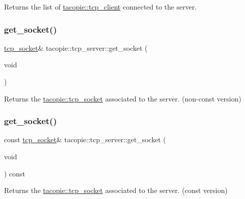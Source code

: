\begin{DoxyReturn}{Returns}
the list of \hyperlink{classtacopie_1_1tcp__client}{tacopie\+::tcp\+\_\+client} connected to the server. 
\end{DoxyReturn}
\mbox{\label{classtacopie_1_1tcp__server_a39a51b9203d42babfd9c4c1a0f4cc340}} 
\subsubsection{\texorpdfstring{get\+\_\+socket()}{get\_socket()}\hspace{0.1cm}{\footnotesize\ttfamily [1/2]}}
{\footnotesize\ttfamily \hyperlink{classtacopie_1_1tcp__socket}{tcp\+\_\+socket}\& tacopie\+::tcp\+\_\+server\+::get\+\_\+socket (\begin{DoxyParamCaption}\item[{void}]{ }\end{DoxyParamCaption})}

\begin{DoxyReturn}{Returns}
the \hyperlink{classtacopie_1_1tcp__socket}{tacopie\+::tcp\+\_\+socket} associated to the server. (non-\/const version) 
\end{DoxyReturn}
\mbox{\label{classtacopie_1_1tcp__server_a373aec294e24a52c3ef6c44920af36e2}} 
\subsubsection{\texorpdfstring{get\+\_\+socket()}{get\_socket()}\hspace{0.1cm}{\footnotesize\ttfamily [2/2]}}
{\footnotesize\ttfamily const \hyperlink{classtacopie_1_1tcp__socket}{tcp\+\_\+socket}\& tacopie\+::tcp\+\_\+server\+::get\+\_\+socket (\begin{DoxyParamCaption}\item[{void}]{ }\end{DoxyParamCaption}) const}

\begin{DoxyReturn}{Returns}
the \hyperlink{classtacopie_1_1tcp__socket}{tacopie\+::tcp\+\_\+socket} associated to the server. (const version) 
\end{DoxyReturn}
\mbox{\label{classtacopie_1_1tcp__server_a76162141e6443953f3ad8e11c4e4d3d7}} 
